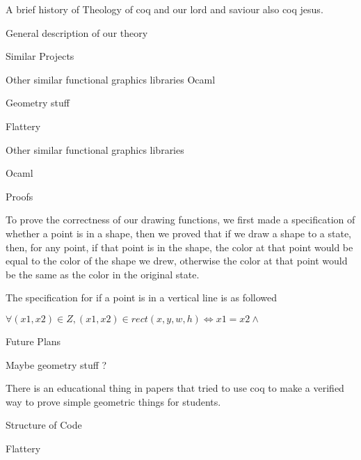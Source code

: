 \documentclass{llncs}
\begin{document}
\begin{section}{A brief history of Theology of coq and our lord and saviour also coq jesus.}\end{section}

\begin{section}{General description of our theory}\end{section}

\begin{section}{Similar Projects}\end{section}
\begin{subsection}{Other similar functional graphics libraries Ocaml}\end{subsection}
\begin{subsection}{Geometry stuff}\end{subsection}

\begin{subsection}{Flattery}\end{subsection}

\begin{subsection}{Other similar functional graphics libraries} \end{subsection} 

\begin{subsubsection}{Ocaml}\end{subsubsection}

\begin{section}{Proofs}\end{section}
To prove the correctness of our drawing functions, we first made a specification of whether a point is in a shape, then we proved that if we draw a shape to a state, then, for any point, if that point is in the shape, the color at that point would be equal to the color of the shape we drew, otherwise the color at that point would be the same as the color in the original state.

The specification for if a point is in a vertical line is as followed

$\forall (x1,x2) \in Z, (x1,x2) \in rect (x,y,w,h) \iff x1 = x2 \land $
\begin{section}{Future Plans}\end{section}
Maybe geometry stuff ? 

There is an educational thing in papers that tried to use coq to make a verified way to prove simple geometric things for students.

Structure of Code

Flattery
\end{document}
